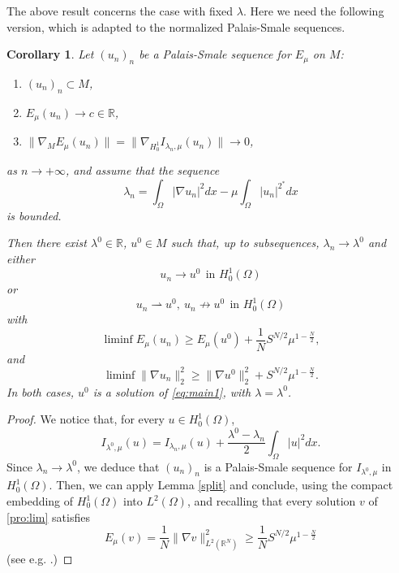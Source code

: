 \documentclass[10pt]{article}
\newcommand{\R}{\mathbb{R}}
\newtheorem{corollary}[proposition]{Corollary}
\theoremstyle{definition}
\numberwithin{equation}{section}
\begin{document}
The above result concerns the case with fixed $\lambda$. Here we need the following version, which
is adapted to the normalized Palais-Smale sequences.
%
\begin{corollary}\label{cor:split}
Let $(u_{n})_n$ be a Palais-Smale sequence for $E_{\mu}$ on $M$:
\begin{enumerate}
\item $(u_n)_n \subset M$,
\item $E_\mu(u_n) \to c \in \R$,
\item $\|\nabla_M E_\mu(u_n)\| = \|\nabla_{H^1_0} I_{\lambda_n,\mu}(u_n)\| \to 0$,
\end{enumerate}
as $n\to+\infty$, and assume that the sequence
\begin{equation}\label{eq:lambda_def}
\lambda_n = \int_{\Omega}|\nabla u_n|^{2}dx-\mu\int_{\Omega}|u_n|^{2^{*}}dx
\end{equation}
is bounded.

Then there exist $\lambda^0\in\R$, $u^0\in M$ such that, up to subsequences,
$\lambda_n\to\lambda^0$ and either
\[
u_{n}\rightarrow u^{0} \ \ \text{in } H^{1}_{0}(\Omega)
\]
or
\[
u_{n}\rightharpoonup u^{0},\ u_{n}\not\rightarrow u^{0} \ \ \text{in } H^{1}_{0}(\Omega)
\]
with
\begin{equation}\label{eq:split_E}
\liminf E_{\mu}(u_{n})\geq E_{\mu}(u^{0})+ \frac{1}{N} S^{N/2}\mu^{1-\frac{N}{2}},
\end{equation}
and
\begin{equation}\label{eq:split_norm}
 \liminf \|\nabla u_{n}\|_{2}^{2}\geq\|\nabla u^{0}\|_{2}^{2}+S^{N/2}\mu^{1-\frac{N}{2}}.
\end{equation}
In both cases, $u^0$ is a solution of \eqref{eq:main1}, with $\lambda = \lambda^0$.
\end{corollary}
%
\begin{proof}
We notice that, for every $u\in H^1_0(\Omega)$,
\[
I_{\lambda^0,\mu} (u) = I_{\lambda_n,\mu} (u) + \frac{\lambda^0-\lambda_n}{2}\int_{\Omega}|u|^{2}dx.
\]
Since $\lambda_n \to \lambda^0$, we deduce that $(u_n)_n$ is a Palais-Smale sequence for
$I_{\lambda^0,\mu}$ in $H^1_0(\Omega)$. Then, we can apply Lemma \ref{split} and conclude, using the
compact embedding of $H^1_0(\Omega)$ into $L^2(\Omega)$, and recalling that every solution $v$
of \eqref{pro:lim} satisfies
\[
E_{\mu}(v) = \frac{1}{N} \|\nabla v\|^{2}_{L^2(\R^N)} \ge \frac{1}{N} S^{N/2}\mu^{1-\frac{N}{2}}
\]
(see e.g. \cite[Ch. III, Rmk. 3.2, $(3^\circ)$]{Struwebook}.)
\end{proof}
\end{document}
